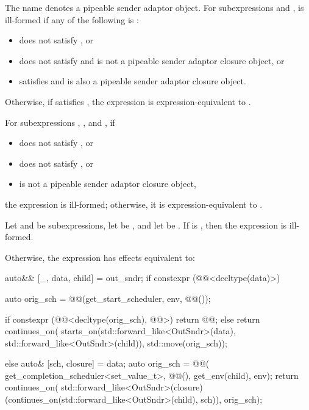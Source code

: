 \pnum
The name  denotes a pipeable sender adaptor object.
For subexpressions  and ,
 is ill-formed if any of the following is :
\begin{itemize}
\item
{} does not satisfy , or
\item
{} does not satisfy  and
 is not
a pipeable sender adaptor closure object, or
\item
{} satisfies  and
is also a pipeable sender adaptor closure object.
\end{itemize}

\pnum
Otherwise, if  satisfies ,
the expression  is expression-equivalent to
.

\pnum
For subexpressions , , and , if
\begin{itemize}
\item
{} does not satisfy , or
\item
{} does not satisfy , or
\item
{} is not a pipeable sender adaptor closure object,
\end{itemize}
the expression  is ill-formed;
otherwise, it is expression-equivalent to
.

\pnum
Let  and  be subexpressions,
let  be , and
let  be .
If  is ,
then the expression  is ill-formed.

\pnum
Otherwise, the expression 
has effects equivalent to:
\begin{codeblock}
auto&& [_, data, child] = out_sndr;
if constexpr (@@<decltype(data)>) {
  auto orig_sch =
    @@(get_start_scheduler, env, @@());

  if constexpr (@@<decltype(orig_sch), @@>) {
    return @@{};
  } else {
    return continues_on(
      starts_on(std::forward_like<OutSndr>(data), std::forward_like<OutSndr>(child)),
      std::move(orig_sch));
  }
} else {
  auto& [sch, closure] = data;
  auto orig_sch = @@(
    get_completion_scheduler<set_value_t>, @@(), get_env(child), env);
  return continues_on(
    std::forward_like<OutSndr>(closure)(continues_on(std::forward_like<OutSndr>(child), sch)),
    orig_sch);
}
\end{codeblock}

